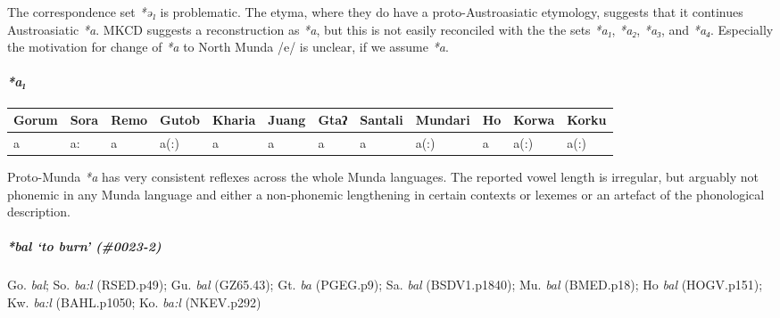 \documentclass[a4paper,]{article}
\let\oldparagraph\paragraph
\renewcommand{\paragraph}[1]{\oldparagraph{#1}\mbox{}}
\let\oldsubparagraph\subparagraph
\renewcommand{\subparagraph}[1]{\oldsubparagraph{#1}\mbox{}}
\begin{document}

The correspondence set \emph{*ə₁} is problematic. The etyma, where they
do have a proto-Austroasiatic etymology, suggests that it continues
Austroasiatic \emph{*a}. MKCD suggests a reconstruction as \emph{*a},
but this is not easily reconciled with the the sets \emph{*a₁},
\emph{*a₂}, \emph{*a₃}, and \emph{*a₄}. Especially the motivation for
change of \emph{*a} to North Munda /e/ is unclear, if we assume
\emph{*a}.

\paragraph{\texorpdfstring{\emph{*a₁}}{*a₁}}\label{a}

\begin{longtable}[]{@{}llllllllllll@{}}
\toprule
Gorum & Sora & Remo & Gutob & Kharia & Juang & Gtaʔ & Santali & Mundari
& Ho & Korwa & Korku\tabularnewline
\midrule
\endhead
a & a: & a & a(:) & a & a & a & a & a(:) & a & a(:) &
a(:)\tabularnewline
\bottomrule
\end{longtable}

Proto-Munda \emph{*a} has very consistent reflexes across the whole
Munda languages. The reported vowel length is irregular, but arguably
not phonemic in any Munda language and either a non-phonemic lengthening
in certain contexts or lexemes or an artefact of the phonological
description.

\subparagraph{\texorpdfstring{\emph{*bal} `to burn'
(\#0023-2)}{*bal to burn (\#0023-2)}}\label{bal-to-burn-0023-2}

Go. \emph{bal}; So. \emph{ba:l} (RSED.p49); Gu. \emph{bal} (GZ65.43);
Gt. \emph{ba} (PGEG.p9); Sa. \emph{bal} (BSDV1.p1840); Mu. \emph{bal}
(BMED.p18); Ho \emph{bal} (HOGV.p151); Kw. \emph{ba:l} (BAHL.p1050; Ko.
\emph{ba:l} (NKEV.p292)
\end{document}
